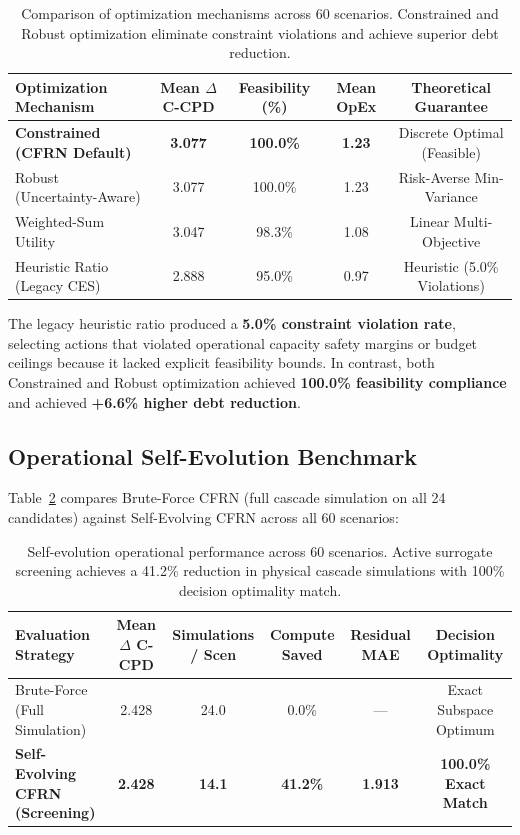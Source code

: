 \documentclass[pdflatex,sn-mathphys-num]{sn-jnl}
\theoremstyle{thmstyleone}
\theoremstyle{thmstyletwo}
\theoremstyle{thmstylethree}
\begin{document}
\begin{table}[htbp]
\centering
\caption{Comparison of optimization mechanisms across 60 scenarios. Constrained and Robust optimization eliminate constraint violations and achieve superior debt reduction.}
\label{tab:opt_mech}
\begin{tabular}{lcccc}
\toprule
\textbf{Optimization Mechanism} & \textbf{Mean $\Delta$ C-CPD} & \textbf{Feasibility (\%)} & \textbf{Mean OpEx} & \textbf{Theoretical Guarantee} \\
\midrule
\textbf{Constrained (CFRN Default)} & \textbf{3.077} & \textbf{100.0\%} & \textbf{1.23} & Discrete Optimal (Feasible) \\
Robust (Uncertainty-Aware) & 3.077 & 100.0\% & 1.23 & Risk-Averse Min-Variance \\
Weighted-Sum Utility & 3.047 & 98.3\% & 1.08 & Linear Multi-Objective \\
Heuristic Ratio (Legacy CES) & 2.888 & 95.0\% & 0.97 & Heuristic (5.0\% Violations) \\
\bottomrule
\end{tabular}
\end{table}

The legacy heuristic ratio produced a \textbf{5.0\% constraint violation rate}, selecting actions that violated operational capacity safety margins or budget ceilings because it lacked explicit feasibility bounds. In contrast, both Constrained and Robust optimization achieved \textbf{100.0\% feasibility compliance} and achieved \textbf{+6.6\% higher debt reduction}.

\subsection{Operational Self-Evolution Benchmark}
Table~\ref{tab:self_evo} compares Brute-Force CFRN (full cascade simulation on all 24 candidates) against Self-Evolving CFRN across all 60 scenarios:

\begin{table}[htbp]
\centering
\caption{Self-evolution operational performance across 60 scenarios. Active surrogate screening achieves a 41.2\% reduction in physical cascade simulations with 100\% decision optimality match.}
\label{tab:self_evo}
\begin{tabular}{lccccc}
\toprule
\textbf{Evaluation Strategy} & \textbf{Mean $\Delta$ C-CPD} & \textbf{Simulations / Scen} & \textbf{Compute Saved} & \textbf{Residual MAE} & \textbf{Decision Optimality} \\
\midrule
Brute-Force (Full Simulation) & 2.428 & 24.0 & 0.0\% & --- & Exact Subspace Optimum \\
\textbf{Self-Evolving CFRN (Screening)} & \textbf{2.428} & \textbf{14.1} & \textbf{41.2\%} & \textbf{1.913} & \textbf{100.0\% Exact Match} \\
\bottomrule
\end{tabular}
\end{table}
\end{document}

